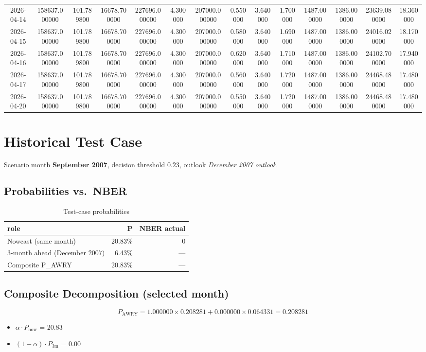 \documentclass[conference,onecolumn]{IEEEtran}
\begin{document}
\begin{longtable}{|c|c|c|c|c|c|c|c|c|c|c|c|c|c|}
2026-04-14 & 158637.000000 & 101.789800 & 16678.700000 & 227696.000000 & 4.300000 & 207000.000000 & 0.550000 & 3.640000 & 1.700000 & 1487.000000 & 1386.000000 & 23639.080000 & 18.360000 \\
2026-04-15 & 158637.000000 & 101.789800 & 16678.700000 & 227696.000000 & 4.300000 & 207000.000000 & 0.580000 & 3.640000 & 1.690000 & 1487.000000 & 1386.000000 & 24016.020000 & 18.170000 \\
2026-04-16 & 158637.000000 & 101.789800 & 16678.700000 & 227696.000000 & 4.300000 & 207000.000000 & 0.620000 & 3.640000 & 1.710000 & 1487.000000 & 1386.000000 & 24102.700000 & 17.940000 \\
2026-04-17 & 158637.000000 & 101.789800 & 16678.700000 & 227696.000000 & 4.300000 & 207000.000000 & 0.560000 & 3.640000 & 1.720000 & 1487.000000 & 1386.000000 & 24468.480000 & 17.480000 \\
2026-04-20 & 158637.000000 & 101.789800 & 16678.700000 & 227696.000000 & 4.300000 & 207000.000000 & 0.550000 & 3.640000 & 1.720000 & 1487.000000 & 1386.000000 & 24468.480000 & 17.480000 \\
\end{longtable}

\section{Historical Test Case}
Scenario month \textbf{September 2007}, decision threshold $0.23$, 
outlook \textit{December 2007 outlook}.
\subsection{Probabilities vs.\ NBER}
\begin{table}[htbp]
\caption{Test-case probabilities}
\begin{center}
\begin{tabular}{|l|r|r|}
\toprule
role & P & NBER actual \\
\midrule
Nowcast (same month) & 20.83\% & 0 \\
3-month ahead (December 2007) & 6.43\% & — \\
Composite P\_AWRY & 20.83\% & — \\
\bottomrule
\end{tabular}

\label{tab:test}
\end{center}
\end{table}
\subsection{Composite Decomposition (selected month)}
\begin{equation}
P_{\mathrm{AWRY}} = 1.000000 \times 0.208281 + 0.000000 \times 0.064331 = 0.208281
\label{eq:decomp}
\end{equation}
\begin{itemize}
\item $\alpha \cdot P_{\mathrm{now}}$ = 20.83%
\item $(1-\alpha) \cdot P_{\mathrm{3m}}$ = 0.00%
\end{itemize}
\end{document}
